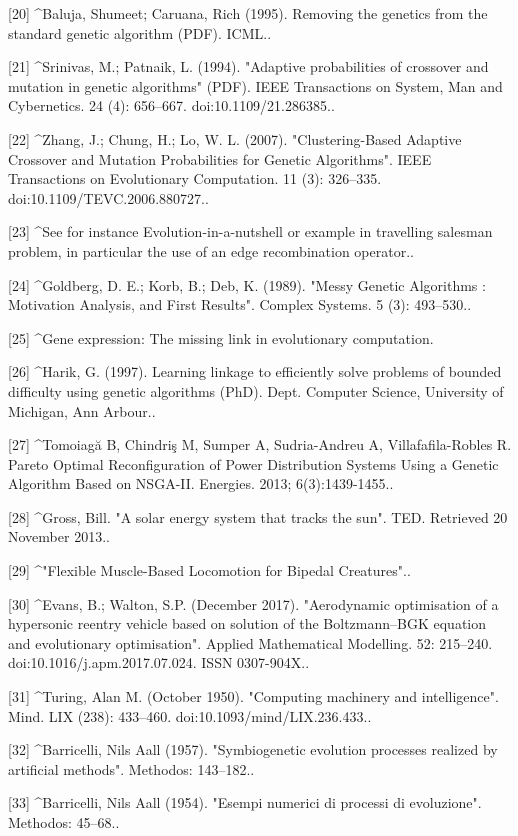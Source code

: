 [20]
^Baluja, Shumeet; Caruana, Rich (1995). Removing the genetics from the standard genetic algorithm (PDF). ICML..

[21]
^Srinivas, M.; Patnaik, L. (1994). "Adaptive probabilities of crossover and mutation in genetic algorithms" (PDF). IEEE Transactions on System, Man and Cybernetics. 24 (4): 656–667. doi:10.1109/21.286385..

[22]
^Zhang, J.; Chung, H.; Lo, W. L. (2007). "Clustering-Based Adaptive Crossover and Mutation Probabilities for Genetic Algorithms". IEEE Transactions on Evolutionary Computation. 11 (3): 326–335. doi:10.1109/TEVC.2006.880727..

[23]
^See for instance Evolution-in-a-nutshell or example in travelling salesman problem, in particular the use of an edge recombination operator..

[24]
^Goldberg, D. E.; Korb, B.; Deb, K. (1989). "Messy Genetic Algorithms : Motivation Analysis, and First Results". Complex Systems. 5 (3): 493–530..

[25]
^Gene expression: The missing link in evolutionary computation.

[26]
^Harik, G. (1997). Learning linkage to efficiently solve problems of bounded difficulty using genetic algorithms (PhD). Dept. Computer Science, University of Michigan, Ann Arbour..

[27]
^Tomoiagă B, Chindriş M, Sumper A, Sudria-Andreu A, Villafafila-Robles R. Pareto Optimal Reconfiguration of Power Distribution Systems Using a Genetic Algorithm Based on NSGA-II. Energies. 2013; 6(3):1439-1455..

[28]
^Gross, Bill. "A solar energy system that tracks the sun". TED. Retrieved 20 November 2013..

[29]
^"Flexible Muscle-Based Locomotion for Bipedal Creatures"..

[30]
^Evans, B.; Walton, S.P. (December 2017). "Aerodynamic optimisation of a hypersonic reentry vehicle based on solution of the Boltzmann–BGK equation and evolutionary optimisation". Applied Mathematical Modelling. 52: 215–240. doi:10.1016/j.apm.2017.07.024. ISSN 0307-904X..

[31]
^Turing, Alan M. (October 1950). "Computing machinery and intelligence". Mind. LIX (238): 433–460. doi:10.1093/mind/LIX.236.433..

[32]
^Barricelli, Nils Aall (1957). "Symbiogenetic evolution processes realized by artificial methods". Methodos: 143–182..

[33]
^Barricelli, Nils Aall (1954). "Esempi numerici di processi di evoluzione". Methodos: 45–68..

